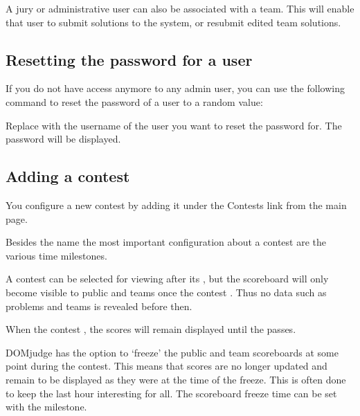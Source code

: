 \documentclass[a4paper,10pt,english,openany]{sphinxmanual}
\begin{document}
\sphinxAtStartPar
A jury or administrative user can also be associated with a team. This
will enable that user to submit solutions to the system, or resubmit
edited team solutions.


\subsection{Resetting the password for a user}
\label{\detokenize{config-basic:resetting-the-password-for-a-user}}
\sphinxAtStartPar
If you do not have access anymore to any admin user, you can use the following
command to reset the password of a user to a random value:

\begin{sphinxVerbatim}[commandchars=\\\{\}]
  
\end{sphinxVerbatim}

\sphinxAtStartPar
Replace  with the username of the user you want to reset the password for.
The password will be displayed.


\subsection{Adding a contest}
\label{\detokenize{config-basic:adding-a-contest}}
\sphinxAtStartPar
You configure a new contest by adding it under the Contests link
from the main page.

\sphinxAtStartPar
Besides the name the most important configuration about a contest
are the various time milestones.

\sphinxAtStartPar
A contest can be selected for viewing after its , but
the scoreboard will only become visible to public and teams once the
contest . Thus no data such as problems and teams is revealed
before then.

\sphinxAtStartPar
When the contest , the scores will remain displayed until the
 passes.

\sphinxAtStartPar
DOMjudge has the option to ‘freeze’ the public and team scoreboards
at some point during the contest. This means that scores are no longer
updated and remain to be displayed as they were at the time of the
freeze. This is often done to keep the last hour interesting for all.
The scoreboard freeze time can be set with the  milestone.
\end{document}
